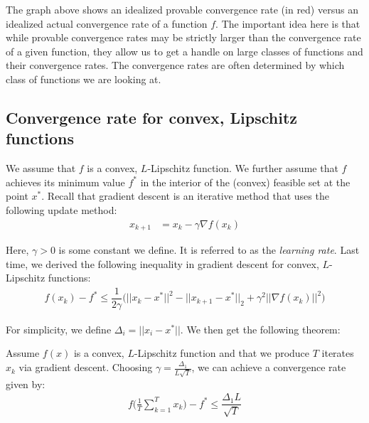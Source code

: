 \documentclass[12pt]{report}
\begin{document}
The graph above shows an idealized provable convergence rate (in red) versus an idealized actual convergence rate of a function $f$. The important idea here is that while provable convergence rates may be strictly larger than the convergence rate of a given function, they allow us to get a handle on large classes of functions and their convergence rates. The convergence rates are often determined by which class of functions we are looking at.

\subsection{Convergence rate for convex, Lipschitz functions}

We assume that $f$ is a convex, $L$-Lipschitz function. We further assume that $f$ achieves its minimum value $f^*$ in the interior of the (convex) feasible set at the point $x^*$. Recall that gradient descent is an iterative method that uses the following update method:
\begin{align*}
x_{k+1} &= x_k - \gamma \nabla f(x_k)\end{align*}

Here, $\gamma > 0$ is some constant we define. It is referred to as the {\it learning rate}. Last time, we derived the following inequality in gradient descent for convex, $L$-Lipschitz functions:
\begin{align*}
f(x_k) - f^* \leq \dfrac{1}{2\gamma}\bigg(||x_k-x^*||^2 - ||x_{k+1}-x^*||_2 +\gamma^2||\nabla f(x_k)||^2\bigg)\end{align*}

For simplicity, we define $\Delta_i = ||x_i-x^*||$. We then get the following theorem:

\begin{theorem}
Assume $f(x)$ is a convex, $L$-Lipschitz function and that we produce $T$ iterates $x_k$ via gradient descent. Choosing $\gamma = \frac{\Delta_1}{L\sqrt{T}}$, we can achieve a convergence rate given by:
\begin{align*}
f\bigg(\frac{1}{T}\sum_{k=1}^T x_k\bigg) - f^* \leq \dfrac{\Delta_1 L}{\sqrt{T}}\end{align*}
\end{theorem}
\end{document}
